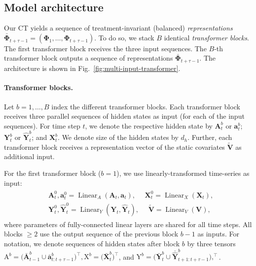 \documentclass{article}
\theoremstyle{plain}
\theoremstyle{definition}
\theoremstyle{remark}
\newcommand{\shortname}{CT\xspace}
\begin{document}
\subsection{Model architecture}

Our \shortname yields a sequence of treatment-invariant (balanced) \emph{representations} $\bar{\mathbf{\Phi}}_{t+\tau-1} = (\mathbf{\Phi}_1, \dots, \mathbf{\Phi}_{t+\tau-1})$. To do so, we stack $B$ identical \emph{transformer blocks}. The first transformer block receives the three input sequences. The $B$-th transformer block outputs a sequence of representations $\bar{\mathbf{\Phi}}_{t+\tau-1}$. The architecture is shown in Fig.~\ref{fig:multi-input-transformer}. 



\paragraph{Transformer blocks.} 

Let $b = 1, \ldots, B$ index the different transformer blocks. Each transformer block receives three parallel sequences of hidden states as input (for each of the input sequences). For time step $t$, we denote the respective hidden state by $\mathbf{A}^b_t$ or $\mathbf{a}^b_t$; $\mathbf{Y}^b_t$ or $\hat{\mathbf{Y}}^b_t$; and $\mathbf{X}^b_t$. We denote size of the hidden states by $d_h$. Further, each transformer block receives a representation vector of the static covariates $\tilde{\mathbf{V}}$ as additional input.  

For the first transformer block ($b=1$), we use linearly-transformed time-series as input:
\begin{align}
    \begin{split}
        & \mathbf{A}_t^0, \mathbf{a}_t^0 = \operatorname{Linear}_A(\mathbf{A}_{t}, \mathbf{a}_{t}), \quad \,\, \mathbf{X}_t^0 = \operatorname{Linear}_X(\mathbf{X}_{t}), \\
        & \mathbf{Y}_t^0, \hat{\mathbf{Y}}_t^0 = \operatorname{Linear}_Y(\mathbf{Y}_{t}, \hat{\mathbf{Y}}_t), \quad \,\, \tilde{\mathbf{V}} = \operatorname{Linear}_V(\mathbf{V}),
    \end{split}
\end{align}
where parameters of fully-connected linear layers are shared for all time steps. All blocks $ \ge 2 $ use the output sequence of the previous block $b-1$ as inputs. For notation, we denote sequences of hidden states after block $b$ by three tensors $\mathrm{A}^b = \big(\bar{\mathbf{A}}^b_{t-1} \cup \bar{\mathbf{a}}^b_{t: t+\tau-1} \big)^\top,  \mathrm{X}^b = \big(\bar{\mathbf{X}}_{t}^b\big)^\top$, and $\mathrm{Y}^b = \big(\bar{\mathbf{Y}}_{t}^b \cup \bar{\hat{\mathbf{Y}}}_{t+1:t+\tau-1}^b \big), ^\top$.
\end{document}
